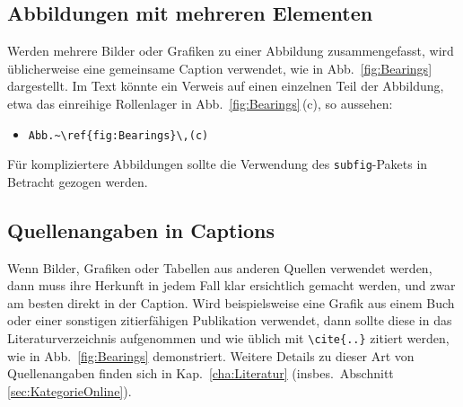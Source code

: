 \subsection{Abbildungen mit mehreren Elementen}

Werden mehrere Bilder oder Grafiken zu einer Abbildung zusammengefasst, 
wird üblicherweise eine gemeinsame Caption verwendet, wie in Abb.~\ref{fig:Bearings}
dargestellt. Im Text könnte ein Verweis auf einen einzelnen Teil der Abbildung, etwa das 
einreihige Rollenlager in Abb.~\ref{fig:Bearings}\,(c), so aussehen:
%
\begin{itemize}
\item[] \verb!Abb.~\ref{fig:Bearings}\,(c)! 
\end{itemize}
%
Für kompliziertere Abbildungen sollte die Verwendung des 
\texttt{subfig}-Pakets \cite{Cochran05} in Betracht gezogen werden.


\subsection{Quellenangaben in Captions}
\label{sec:QuellenangabenInCaptions}

Wenn Bilder, Grafiken oder Tabellen aus anderen Quellen verwendet werden, dann 
muss ihre Herkunft in jedem Fall klar ersichtlich gemacht werden, und zwar am 
besten direkt in der Caption.
Wird beispielsweise eine Grafik aus einem Buch oder einer sonstigen 
zitierfähigen Publikation verwendet, dann sollte diese in das Literaturverzeichnis 
aufgenommen und wie üblich mit
\verb!\cite{..}! zitiert werden, wie in Abb.\ \ref{fig:Bearings} demonstriert. 
Weitere Details zu dieser Art von Quellenangaben finden sich in 
Kap.\ \ref{cha:Literatur} (insbes.\ Abschnitt \ref{sec:KategorieOnline}).

